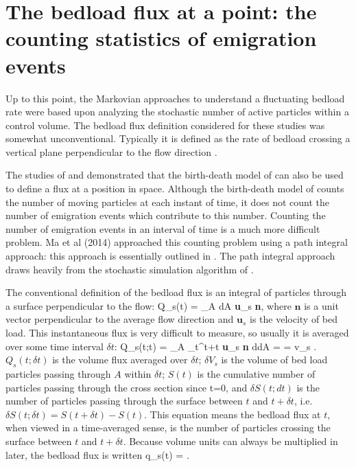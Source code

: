 \section{The bedload flux at a point: the counting statistics of emigration events} 

Up to this point, the Markovian approaches to understand a fluctuating bedload rate were based upon analyzing the stochastic number of active particles within a control volume. 
The bedload flux definition considered for these studies was somewhat unconventional. 
Typically it is defined as the rate of bedload crossing a vertical plane perpendicular to the flow direction \citep{Ballio2014}. 

The studies of \citet{Heyman2013} and \citet{Ma2014b} demonstrated that the birth-death model of \citet{Ancey2008} can also be used to define a flux at a position in space. 
Although the birth-death model of \citet{Ancey2008} counts the number of moving particles at each instant of time, it does not count the number of emigration events which contribute to this number. 
Counting the number of emigration events in an interval of time is a much more difficult problem.
Ma et al (2014) approached this counting problem using a path integral approach: this approach is essentially outlined in \citet{Ohkubo2009}. 
The path integral approach draws heavily from the stochastic simulation algorithm of \citet{Gillespie1977}. 

The conventional definition of the bedload flux is an integral of particles through a surface perpendicular to the flow: 
\be Q_s(t) = \int \int_A dA \textbf{u}_s \cdot \textbf{n}, \ee
where $\textbf{n}$ is a unit vector perpendicular to the average flow direction and $\textbf{u}_s$ is the velocity of bed load. 
This instantaneous flux is very difficult to measure, so usually it is averaged over some time interval $\delta t$: 
\be Q_s(t;\delta t) =  \int \int_A \int_t^{t+\delta t} \textbf{u}_s \cdot \textbf{n} d\tau dA =  = v_s . \ee
$Q_s(t;\delta t)$ is the volume flux averaged over $\delta t$; $\delta V_s$ is the volume of bed load particles passing through $A$ within $\delta t$; $S(t)$ is the cumulative number of particles passing through the cross section since t=0, and $\delta S(t;dt)$ is the number of particles passing through the surface between $t$ and $t+\delta t$, i.e. $\delta S(t; \delta t) = S(t+\delta t) - S(t)$. 
This equation means the bedload flux at $t$, when viewed in a time-averaged sense, is the number of particles crossing the surface between $t$ and $t+\delta t$. 
Because volume units can always be multiplied in later, the bedload flux is written 
\be q_s(t) = . \ee

